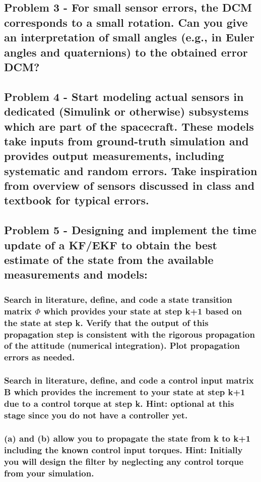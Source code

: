 \subsection{Problem 3 - For small sensor errors, the DCM corresponds to a small rotation. Can you give an interpretation of small angles (e.g., in Euler angles and quaternions) to the obtained error DCM?}

\subsection{Problem 4 - Start modeling actual sensors in dedicated (Simulink or otherwise) subsystems which are part of the spacecraft. These models take inputs from ground-truth simulation and provides output measurements, including systematic and random errors. Take inspiration from overview of sensors discussed in class and
textbook for typical errors.}

\subsection{Problem 5 - Designing and implement the time update of a KF/EKF to obtain the best estimate of the state from the available measurements and models:}

\subsubsection{Search in literature, define, and code a state transition matrix $\Phi$ which provides your state at step k+1 based on the state at step k. Verify that the output of this propagation step is consistent with the rigorous propagation of the attitude (numerical integration). Plot propagation errors as needed.}

\subsubsection{Search in literature, define, and code a control input matrix B which provides the increment to your state at step k+1 due to a control torque at step k. Hint: optional at this stage since you do not have a controller yet.}


\subsubsection{(a) and (b) allow you to propagate the state from k to k+1 including the known control input torques. Hint: Initially you will design the filter by neglecting any control torque from your simulation.}

